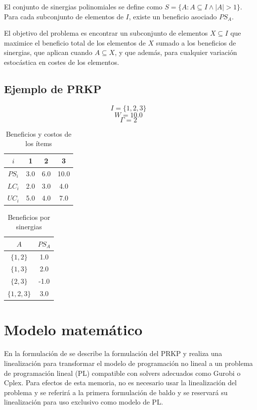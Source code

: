 \documentclass[spanish, a4paper, 12pt, openany,final]{book}
\begin{document}
	El conjunto de sinergias polinomiales se define como $S = \{ A: A \subseteq I \land |A|>1  \}$. Para cada subconjunto de elementos de $I$, existe un beneficio asociado $PS_A$.
	
	El objetivo del problema es encontrar un subconjunto de elementos $X \subseteq I$ que maximice el beneficio total de los elementos de $X$ sumado a los beneficios de sinergias, que aplican cuando $A\subseteq X$, y que además, para cualquier variación estocástica en costes de los elementos.
	
	\subsection*{Ejemplo de PRKP}
		$$I =\{1,2,3\}$$
		$$W = 10.0$$
		$$\Gamma = 2$$

	\begin{table}[H]
		\centering
	\begin{tabular}{|c|c|c|c|}
		\hline
		$i$ & 1 & 2 & 3 \\
		\hline
		$PS_i$ & 3.0 & 6.0 & 10.0 \\
		\hline
		$LC_i$ & 2.0 & 3.0 & 4.0 \\
		\hline
		$UC_i$ & 5.0 & 4.0 & 7.0 \\
		\hline
	\end{tabular}
	\caption{Beneficios y costos de los ítems}
	\end{table}
	
	\begin{table}[H]
		\centering
		\begin{tabular}{|c|c|}
			\hline
			$A$    & $PS_A$\\
			\hline
			$\{1,2\}$ & 1.0 \\
			\hline
			$\{1,3\}$ & 2.0 \\
			\hline
			$\{2,3\}$ & -1.0\\
			\hline
			$\{1,2,3\}$ & 3.0\\
			\hline
		\end{tabular}
		\caption{Beneficios por sinergias}
	\end{table}
	
	
	
	
    
    \section{Modelo matemático}
    
    
    En la formulación de \cite{baldo_polynomial_2023} se describe la formulación del PRKP y realiza una linealización para transformar el modelo de programación no lineal a un problema de programación lineal (PL) compatible con solvers adecuados como Gurobi o Cplex. Para efectos de esta memoria, no es necesario usar la linealización del problema y se referirá a la primera formulación de baldo y se reservará su linealización para uso exclusivo como modelo de PL.
    
\end{document}
